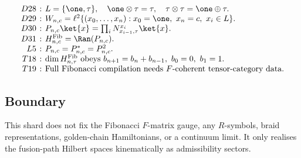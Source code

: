 {\small
\[
\setlength{\arraycolsep}{2pt}
\begin{array}{rcl}
D28 &:& L=\{\one,\tau\},\quad
        \one\otimes\tau=\tau,\quad \tau\otimes\tau=\one\oplus\tau.\\
D29 &:& W_{n,c}=\ell^2\{(x_0,\ldots,x_n):x_0=\one,\ x_n=c,\ x_i\in L\}.\\
D30 &:& P_{n,c}\ket{x}=\prod_i N_{x_{i-1},\tau}^{x_i}\ket{x}.\\
D31 &:& H^{\mathrm{Fib}}_{n,c}=\Ran(P_{n,c}).\\
L5 &:& P_{n,c}=P_{n,c}^*=P_{n,c}^2.\\
T18 &:& \dim H^{\mathrm{Fib}}_{n,\tau}\text{ obeys }b_{n+1}=b_n+b_{n-1},
        \ b_0=0,\ b_1=1.\\
T19 &:& \text{Full Fibonacci compilation needs }F\text{-coherent tensor-category data.}
\end{array}
\]
}

\subsection{Boundary}

This shard does not fix the Fibonacci \(F\)-matrix gauge, any \(R\)-symbols,
braid representations, golden-chain Hamiltonians, or a continuum limit.  It only
realises the fusion-path Hilbert spaces kinematically as admissibility sectors.
